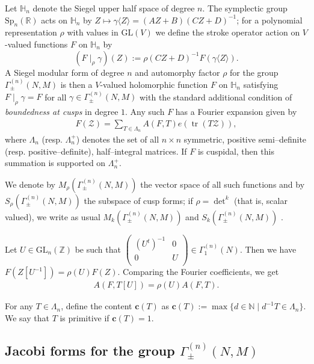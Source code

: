 \documentclass[11pt]{amsart}
\numberwithin{equation}{section}
\newcommand{\mbb}{\mathbb}
\newcommand{\mc}{\mathcal}
\newcommand{\mf}{\mathbf}
\newcommand{\mrm}{\mathrm} %
\newcommand{\smat}[4]{\left( \begin{smallmatrix} #1 & #2 \\ #3 & #4 \\ \end{smallmatrix} \right)}
\DeclareMathOperator{\tr}{tr}
\newcommand{\glnz}{\mrm{GL}_n( \mbb Z)}
\newcommand{\sumn}{\sum \nolimits}
\begin{document}
Let $\mbb H_n$ denote the Siegel upper half space of degree $n$. The symplectic group $\mrm{Sp}_n(\mbb R)$ acts on $\mbb H_n$ by
$Z\mapsto \gamma \langle Z \rangle=(AZ+B)(CZ+D)^{-1}$; for a polynomial representation $\rho$ 
with values in $\mrm{GL}(V)$ we define the stroke operator action on $V$-valued functions $F$ on $\mbb H_n$ by
\[ (F\mid_{\rho}\gamma)(Z):=\rho(CZ+D)^{-1}F(\gamma \langle Z \rangle). \]
A Siegel modular form of degree $n$ and automorphy factor $\rho$ for the group $\Gamma_\pm^{(n)}(N, M)$
is then a $V$-valued holomorphic function $F$ on $\mbb H_n$ satisfying
$F\mid_{\rho}\gamma= F$ for all $\gamma\in \Gamma_\pm^{(n)}(N, M)$
with the standard additional condition of \textit{boundedness at cusps} in degree $1$.
Any such $F$ has a Fourier expansion given by
\begin{align}
    F(\mc Z)= \sumn_{T\in \Lambda_n}A(F, T)e(\tr(T\mc Z)),
\end{align}
where $\Lambda_n$ (resp. $\Lambda_n^+$) denotes the set of all $n\times n$ symmetric, positive semi--definite (resp. positive--definite), half--integral matrices. If $F$ is cuspidal, then this summation is supported on $\Lambda_n^+$. 

We denote by $M_{\rho}(\Gamma_\pm^{(n)}(N, M))$ the vector space of all such functions and by
$S_{\rho}(\Gamma_\pm^{(n)}(N, M))$ the subspace of cusp forms; if $\rho=\det^k$ (that is, scalar valued), we write
as usual $M_k(\Gamma_\pm^{(n)}(N, M))$ and $S_k(\Gamma_\pm^{(n)}(N, M))$ . 

Let $U\in \glnz$ be such that $\smat{(U^t)^{-1}}{0}{0}{U}\in \Gamma_1^{(n)}(N)$. Then we have  $F(Z[U^{-1}])= \rho(U) F(Z)$. Comparing the Fourier coefficients, we get
\begin{align}\label{glnz-eq}
A(F, T[U])= \rho(U) A(F, T).
\end{align}

For any $T\in \Lambda_n$, define the content $\mf c(T)$ as $\mf c(T):=\max\{d\in \mbb N \;| \;d^{-1}T \in \Lambda_n\}$. We say that $T$ is primitive if $\mf c(T)=1$.


\subsection{Jacobi forms for the group \texorpdfstring{$\Gamma_\pm^{(n)}(N, M)$}{gamma}}\label{jacobi}
\end{document}
